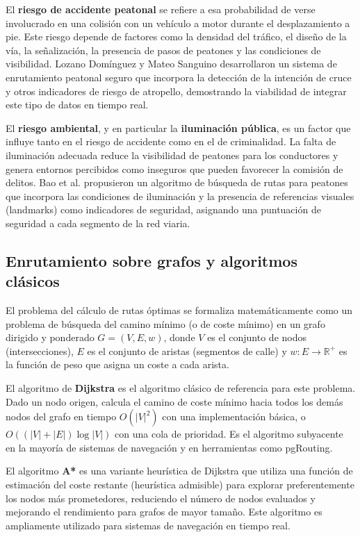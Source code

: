 El \textbf{riesgo de accidente peatonal} se refiere a esa probabilidad de verse involucrado en una colisión con un vehículo a motor durante el desplazamiento a pie. Este riesgo depende de factores como la densidad del tráfico, el diseño de la vía, la señalización, la presencia de pasos de peatones y las condiciones de visibilidad. Lozano Domínguez y Mateo Sanguino \cite{lozano2021} desarrollaron un sistema de enrutamiento peatonal seguro que incorpora la detección de la intención de cruce y otros indicadores de riesgo de atropello, demostrando la viabilidad de integrar este tipo de datos en tiempo real.

El \textbf{riesgo ambiental}, y en particular la \textbf{iluminación pública}, es un factor que influye tanto en el riesgo de accidente como en el de criminalidad. La falta de iluminación adecuada reduce la visibilidad de peatones para los conductores y genera entornos percibidos como inseguros que pueden favorecer la comisión de delitos. Bao et al. \cite{bao2017} propusieron un algoritmo de búsqueda de rutas para peatones que incorpora las condiciones de iluminación y la presencia de referencias visuales (landmarks) como indicadores de seguridad, asignando una puntuación de seguridad a cada segmento de la red viaria.

\subsection{Enrutamiento sobre grafos y algoritmos clásicos}
\label{subsec:grafos}

El problema del cálculo de rutas óptimas se formaliza matemáticamente como un problema de búsqueda del camino mínimo (o de coste mínimo) en un grafo dirigido y ponderado $G = (V, E, w)$, donde $V$ es el conjunto de nodos (intersecciones), $E$ es el conjunto de aristas (segmentos de calle) y $w: E \rightarrow \mathbb{R}^+$ es la función de peso que asigna un coste a cada arista.

El algoritmo de \textbf{Dijkstra} \cite{gallo1988} es el algoritmo clásico de referencia para este problema. Dado un nodo origen, calcula el camino de coste mínimo hacia todos los demás nodos del grafo en tiempo $O(|V|^2)$ con una implementación básica, o $O((|V|+|E|)\log|V|)$ con una cola de prioridad. Es el algoritmo subyacente en la mayoría de sistemas de navegación y en herramientas como pgRouting.

El algoritmo \textbf{A*} es una variante heurística de Dijkstra que utiliza una función de estimación del coste restante (heurística admisible) para explorar preferentemente los nodos más prometedores, reduciendo el número de nodos evaluados y mejorando el rendimiento para grafos de mayor tamaño. Este algoritmo es ampliamente utilizado para sistemas de navegación en tiempo real.

